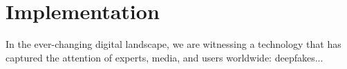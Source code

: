 \documentclass[main.tex]{subfiles}
\begin{document}
\section{Implementation}\label{sec:implementation}
In the ever-changing digital landscape, we are witnessing a technology that has captured the attention of experts, media, and users worldwide: deepfakes...
\end{document}
